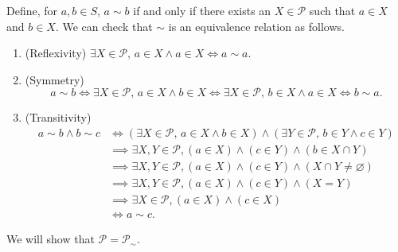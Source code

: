 \documentclass[12pt,letterpaper,boxed]{hmcpset}
\begin{document}
\begin{solution}
	Define, for $a,b\in S$, $a\sim b$ if and only if there exists
	an $X\in\mathscr{P}$ such that $a\in X$ and $b\in X$. We can check that $\sim$ is an equivalence relation as follows.
	\begin{enumerate}
		\item (Reflexivity) $\exists X\in\mathscr{P},\,a\in X \land a\in X\iff a\sim a$.
		\item (Symmetry) \[a\sim b\iff\exists X\in\mathscr{P},\,a\in X \land b\in X\iff\exists X\in\mathscr{P},\,b\in X \land a\in X\iff b\sim a.\]
		\item (Transitivity) 
		\begin{align*}
			a\sim b\land b\sim c&\iff\left(\exists X\in\mathscr{P},\,a\in X \land b\in X\right)\land\left(\exists Y\in\mathscr{P},\,b\in Y \land c\in Y\right)\\
			&\implies \exists X, Y\in\mathscr{P}, \left(a\in X \right)\land\left(c\in Y\right)\land\left(b\in X\cap Y\right)\\
			&\implies \exists X, Y\in\mathscr{P}, \left(a\in X \right)\land\left(c\in Y\right)\land\left( X\cap Y\ne \varnothing\right)\\
			&\implies \exists X, Y\in\mathscr{P}, \left(a\in X \right)\land\left(c\in Y\right)\land\left( X= Y\right)\\
			&\implies\exists X\in\mathscr{P},\left(a\in X\right)\land (c\in X)\\
			&\iff 	a\sim c.
		\end{align*}
	\end{enumerate}
	We will show that
	$\mathscr{P} = \mathscr{P}_{\sim}$. 
		

\end{solution}
\end{document}
